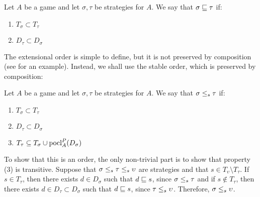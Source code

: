 \documentclass{article}
\begin{document}
\begin{definition}
  Let $A$ be a game and let $\sigma,\tau$ be strategies for $A$.  We say that $\sigma\sqsubseteq\tau$ if:
  
  \begin{enumerate}[1)]
    \item $T_\sigma\subset T_\tau$
    \item $D_\tau\subset D_\sigma$
  \end{enumerate}
\end{definition}

The extensional order is simple to define, but it is not preserved by composition (see \cite{mcCHFiniteND} for an example).  Instead, we shall use the stable order, which is preserved by composition:

\begin{definition}
  Let $A$ be a game and let $\sigma,\tau$ be strategies for $A$.  We say that $\sigma{\;\le_s\;}\tau$ if:

  \begin{enumerate}[1)]
    \item $T_\sigma\subset T_\tau$
    \item $D_\tau\subset D_\sigma$
    \item $T_\tau\subseteq T_\sigma \cup \operatorname{pocl}_A^P(D_\sigma)$
  \end{enumerate}
\end{definition}

To show that this is an order, the only non-trivial part is to show that property (3) is transitive.  Suppose that $\sigma{\;\le_s\;}\tau{\;\le_s\;}\upsilon$ are strategies and that $s\in T_\upsilon\setminus T_\tau$.  If $s\in T_\tau$, then there exists $d\in D_\sigma$ such that $d\sqsubseteq s$, since $\sigma{\;\le_s\;}\tau$ and if $s\not\in T_\tau$, then there exists $d\in D_\tau\subset D_\sigma$ such that $d\sqsubseteq s$, since $\tau{\;\le_s\;}\upsilon$.  Therefore, $\sigma{\;\le_s\;}\upsilon$.
\end{document}
